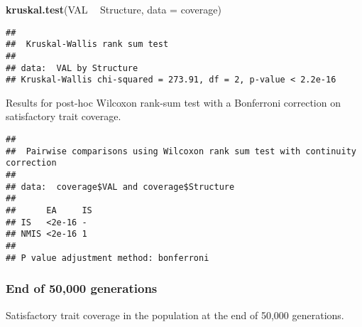 \documentclass[]{book}
\newenvironment{Shaded}{\begin{snugshade}}{\end{snugshade}}
\newcommand{\DataTypeTok}[1]{\textcolor[rgb]{0.13,0.29,0.53}{#1}}
\newcommand{\KeywordTok}[1]{\textcolor[rgb]{0.13,0.29,0.53}{\textbf{#1}}}
\newcommand{\NormalTok}[1]{#1}
\newcommand{\OperatorTok}[1]{\textcolor[rgb]{0.81,0.36,0.00}{\textbf{#1}}}
\newcommand{\OtherTok}[1]{\textcolor[rgb]{0.56,0.35,0.01}{#1}}
\newcommand{\StringTok}[1]{\textcolor[rgb]{0.31,0.60,0.02}{#1}}
\begin{document}
\begin{Shaded}
\begin{Highlighting}[]
\KeywordTok{kruskal.test}\NormalTok{(VAL }\OperatorTok{~}\StringTok{ }\NormalTok{Structure, }\DataTypeTok{data =}\NormalTok{ coverage)}
\end{Highlighting}
\end{Shaded}

\begin{verbatim}
## 
##  Kruskal-Wallis rank sum test
## 
## data:  VAL by Structure
## Kruskal-Wallis chi-squared = 273.91, df = 2, p-value < 2.2e-16
\end{verbatim}

Results for post-hoc Wilcoxon rank-sum test with a Bonferroni correction on satisfactory trait coverage.

\begin{Shaded}
\end{Shaded}

\begin{verbatim}
## 
##  Pairwise comparisons using Wilcoxon rank sum test with continuity correction 
## 
## data:  coverage$VAL and coverage$Structure 
## 
##      EA     IS
## IS   <2e-16 - 
## NMIS <2e-16 1 
## 
## P value adjustment method: bonferroni
\end{verbatim}

\hypertarget{end-of-50000-generations-20}{%
\subsubsection{End of 50,000 generations}\label{end-of-50000-generations-20}}

Satisfactory trait coverage in the population at the end of 50,000 generations.
\end{document}
